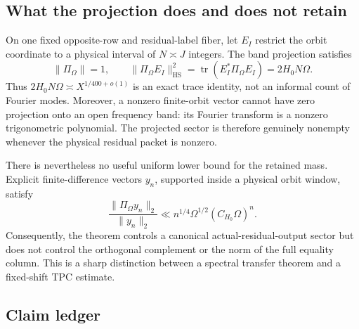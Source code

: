 \subsection{What the projection does and does not retain}

On one fixed opposite-row and residual-label fiber, let \(E_I\)
restrict the orbit coordinate to a physical interval of
\(N\asymp J\) integers.  The band projection satisfies
\begin{equation}
 \|\Pi_\Omega\|=1,
 \qquad
 \|\Pi_\Omega E_I\|_{\mathrm{HS}}^2
 =\operatorname{tr}(E_I^*\Pi_\Omega E_I)=2H_0N\Omega.
 \label{eq:tpc47-intro-shannon-number}
\end{equation}
Thus \(2H_0N\Omega\asymp X^{1/400+o(1)}\) is an exact trace identity,
not an informal count of Fourier modes.  Moreover, a nonzero
finite-orbit vector cannot have zero projection onto an open frequency
band: its Fourier transform is a nonzero trigonometric polynomial.
The projected sector is therefore genuinely nonempty whenever the
physical residual packet is nonzero.

There is nevertheless no useful uniform lower bound for the retained
mass.  Explicit finite-difference vectors \(y_n\), supported inside a
physical orbit window, satisfy
\begin{equation}
 \frac{\|\Pi_\Omega y_n\|_2}{\|y_n\|_2}
 \ll n^{1/4}\Omega^{1/2}(C_{H_0}\Omega)^n.
 \label{eq:tpc47-intro-small-mass}
\end{equation}
Consequently, the theorem controls a canonical actual-residual-output
sector but
does not control the orthogonal complement or the norm of the full
equality column.  This is a sharp distinction between a spectral
transfer theorem and a fixed-shift TPC estimate.

\subsection{Claim ledger}

